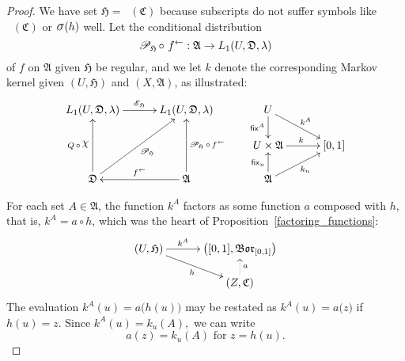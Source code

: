 \documentclass[
twoside=true,
paper=letter,
fontsize=9pt,
pagesize=auto,
leqno,
openany,
headsepline,
overfullrule,
]{scrbook}
\theoremstyle{plain}
\theoremstyle{plain}
\theoremstyle{definition}
\theoremstyle{bfnoteitalic}
\theoremstyle{bfnoteroman}
\newcommand{\sigalg}[1]{\mathfrak{#1}}
\newcommand{\cali}[1]{\mathscr{#1}}
\newcommand{\sfop}[1]{\mathsf{#1}}
\newcommand{\condexpop}[1]{\mathop{\cali{E}\hspace{-1pt}}\nolimits_{#1}}
\newcommand{\condprobop}[1]{\mathop{\cali{P}\hspace{-1pt}}\nolimits_{#1}}
\newcommand{\borel}{\mathfrak{Bor}}
\newcommand{\sagb}{\mathop{\hbox{\large{$\sigma$}}}\nolimits}
\newcommand{\charfunction}[1]{\mathop{{\raisebox{2pt}{$\chi$}}_{#1}}}
\newcommand{\preimage}[1]{\mathop{#1^{\leftarrow}}}
\newcommand{\sigmaalgebra}{\sigalg{A}}
\newcommand{\sigmaalgebraiii}{\sigalg{C}}
\newcommand{\funca}{a}
\newcommand{\funch}{h}
\newcommand{\funck}{k}
\newcommand{\function}{f}
\newcommand{\functioniii}{h}
\newcommand{\measurespace}{X}
\newcommand{\measurespaceiii}{Z}
\newcommand{\mspaceeltiii}{z}
\newcommand{\measureiii}{\lambda}
\newcommand{\seti}{A}
\newcommand{\fixinthefirst}[1]{\sfop{fix}_{#1}}
\newcommand{\fixinthesecond}[1]{\sfop{fix}^{#1}}
\newcommand{\uspace}{U}%
\newcommand{\uspaceelt}{u}
\newcommand{\uspacesig}{\sigalg{D}}
\begin{document}
\begin{proof}
We have set
$\sigalg{H} = \preimage{\functioniii}(\sigmaalgebraiii)$ because
subscripts do not suffer symbols like
$\preimage{\functioniii}(\sigmaalgebraiii)$ or $\sagb(\functioniii)$
well.
Let the conditional distribution
\[
\condprobop{\sigalg{H}}\circ\, \preimage{\function}:
\sigmaalgebra \to L_1(\uspace,\uspacesig,\measureiii)
\]
of $\function$ on $\sigmaalgebra$ given $\sigalg{H}$
be regular, and we let
$\funck$
denote the corresponding Markov kernel given
$(\uspace,\sigalg{H})$ and $(\measurespace,\sigmaalgebra)$, as illustrated:
\[
\xymatrix@R=16pt@C=30pt{
L_1(\uspace, \uspacesig, \measureiii) \ar[r]^{\condexpop{\sigalg{H}}}
& L_1(\uspace, \uspacesig, \measureiii)
& \uspace
\ar[d]_-{\fixinthesecond{\seti}}
\ar[dr]^{\funck^\seti}
\\
&
& \uspace\times\sigmaalgebra \ar[r]^{\funck}
& [0,1]
\\
\uspacesig
\ar[uu]^{Q\,\circ\,\charfunction{}}
\ar[uur]_{\condprobop{\sigalg{H}}}
& \sigmaalgebra
\ar[uu]_{\condprobop{\sigalg{H}}\circ \preimage{\function}}
\ar[l]_{\preimage{\function}}
& \sigmaalgebra
\ar[u]^{\fixinthefirst{\uspaceelt}}
\ar[ur]_{\funck_\uspaceelt}
&
\\
}
\]

For each set $\seti\in\sigmaalgebra$, the function
$\funck^\seti$ factors as some function $\funca$ composed with $\funch$,
that is, $\funck^\seti= \funca \circ \funch$,
which was the heart of Proposition~\ref{factoring_functions}:
\[
\xymatrix@R=14pt@C=30pt{
(\uspace,\sigalg{H})
\ar[r]^-{\funck^\seti}
\ar[dr]_{\functioniii}
& \bigl([0,1],\borel_{[0,1]}\bigr) \\
 & (\measurespaceiii,\sigmaalgebraiii) \ar@{.>}[u]_{\funca}\\
}
\]
The evaluation
$\funck^\seti(\uspaceelt)
=
a\bigl(\funch(\uspaceelt)\bigr)$
may be restated as
$\funck^\seti(\uspaceelt)
=
a\bigl(\mspaceeltiii)$
if
$\funch(\uspaceelt)
=
\mspaceeltiii$.
Since $\funck^\seti(\uspaceelt) = \funck_\uspaceelt(\seti),$
we can write
\[
a(\mspaceeltiii)=\funck_\uspaceelt(\seti) \text{ for } \mspaceeltiii = \funch(\uspaceelt).
\]


\end{proof}
\end{document}
